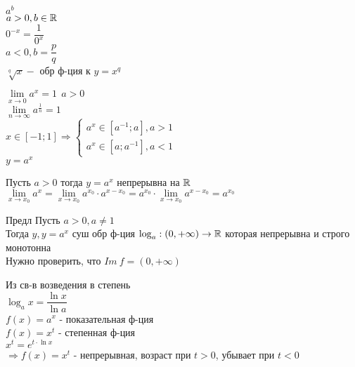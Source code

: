 $ a^b\ $ \\
$ a > 0, b \in \mathbb{R} $ \\
$ 0^{-x} = \dfrac{1}{0^x} $ \\
$ a < 0, b = \dfrac{p}{q} $\\
$ \sqrt[q]{x} - $ обр ф-ция к 	$ y = x^q $ 
\begin{lemma}
	$ \lim\limits_{x \rightarrow 0} a^x = 1 \ \ a > 0 $ \\
	$ \lim\limits_{n \rightarrow \infty} a^{\frac{1}{n}} = 1 $ \\ 
	$ x \in [-1; 1] \Rightarrow \left\{ \begin{array}{l}
		a^x \in [ a^{-1}; a ], a > 1 \\ a^x \in [a; a^{-1}], a < 1 
	\end{array} \right. $\\
	$ y = a^x $ %
\end{lemma} 
\begin{theorem} Пусть $ a > 0 $ тогда $ y = a^x $ непрерывна на $ \mathbb{R} $ \\
	$ \lim\limits_{x \rightarrow x_0} a^x = \lim\limits_{x \rightarrow x_0}  a^{x_0} \cdot a^{x-x_0} = a^{x_0} \cdot \lim\limits_{x \rightarrow x_0} a^{x-x_0} = a^{x_0} $ 
\end{theorem}
Предл Пусть $ a > 0, a \neq 1 $\\
Тогда $ y, y=a^x $ суш обр ф-ция $ \log_a : (0, +\infty) \rightarrow \mathbb{R} $ которая непрерывна и строго монотонна \\
Нужно проверить, что $ Im \ f = (0, +\infty) $

Из св-в возведения в степень \\
$ \log_a x= \dfrac{\ln x}{\ln a} $\\
$ f(x) = a^x $ - показательная ф-ция \\
$ f(x) = x^t $ - степенная ф-ция \\
$ x^t = e^{t \cdot \ln x}$ \\
$ \Rightarrow f(x) = x^t $ - непрерывная, возраст при $ t > 0 $, убывает при $ t < 0 $ \\


